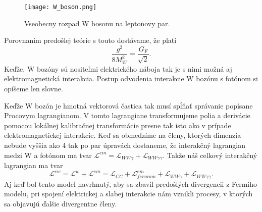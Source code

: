 \documentclass[../../main.tex]{subfiles}
\begin{document}
\begin{figure}[!h]
\centering
\texttt{[image: W\_boson.png]}
\caption{Vseobecny rozpad W bosonu na leptonovy par.}
\label{sf1:fig:W_boson}
\end{figure}
\newline
Porovnaním predošlej teórie s touto dostávame, že platí
\begin{equation}
\frac{g^2}{8M_W^2}=\frac{G_F}{\sqrt{2}}.
\end{equation}
Keďže, W bozóny sú nositeľmi elektrického náboja tak je s nimi možná aj elektromagnetická interakcia. Postup odvodenia interakcie W bozónu s fotónom si opíšeme len slovne.

Keďže W bozón je hmotná vektorová častica tak musí spĺňať správanie popísane Procovym lagrangianom. V tomto lagrangiane transformujeme polia a derivácie pomocou lokálnej kalibračnej transformácie presne tak isto ako v prípade elektromagnetickej interakcie. Keď sa obmedzíme na členy, ktorých dimenzia nebude vyššia ako 4 tak po par úpravách dostaneme, že interakčný lagrangian medzi W a fotónom ma tvar $\mathcal{L}^{em}=\mathcal{L}_{WW\gamma}+\mathcal{L}_{WW\gamma \gamma}$. Takže náš celkový interakčný lagrangian ma tvar
$$
\mathcal{L}^{ew}=\mathcal{L}^{w}+\mathcal{L}^{em} =\mathcal{L}_{CC}+\mathcal{L}^{em}_{fermion}+\mathcal{L}_{WW\gamma}+\mathcal{L}_{WW\gamma\gamma}.
$$
Aj keď bol tento model navrhnutý, aby sa zbavil predošlých divergencii z Fermiho modelu, pri spojení elektrickej a slabej interakcie nám vznikli procesy, v ktorých sa objavujú ďalšie divergentne členy.
 
 
 
 
 
\end{document}

